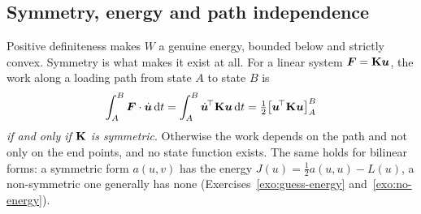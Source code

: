 \subsection{Symmetry, energy and path independence}\label{ssec:symmetry}
%
Positive definiteness makes $W$ a genuine energy, bounded below and strictly
convex. Symmetry is what makes it exist at all. For a linear system
$\bm{F}=\mathbf{K}\bm{u}$, the work along a loading path from state $A$ to state $B$ is
\[
  \int_A^B\bm{F}\cdot\dot{\bm{u}}\,\mathrm{d} t=\int_A^B\dot{\bm{u}}^{\!\top}\mathbf{K}\bm{u}\,\mathrm{d} t
  =\tfrac12\bigl[\bm{u}^{\!\top}\mathbf{K}\bm{u}\bigr]_A^B
\]
\emph{if and only if $\mathbf{K}$ is symmetric}. Otherwise the work depends on
the path and not only on the end points, and no state function exists. The
same holds for bilinear forms: a symmetric form $a(u,v)$ has the energy
$J(u)=\tfrac12a(u,u)-L(u)$, a non-symmetric one generally has none
(Exercises~\ref{exo:guess-energy} and~\ref{exo:no-energy}).

